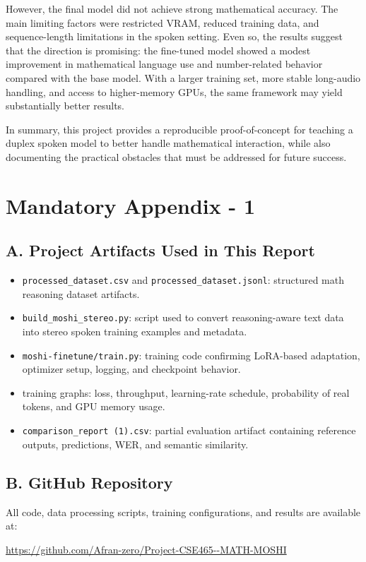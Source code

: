 \documentclass[12pt,a4paper]{article}
\begin{document}
However, the final model did not achieve strong mathematical accuracy. The main limiting factors were restricted VRAM, reduced training data, and sequence-length limitations in the spoken setting. Even so, the results suggest that the direction is promising: the fine-tuned model showed a modest improvement in mathematical language use and number-related behavior compared with the base model. With a larger training set, more stable long-audio handling, and access to higher-memory GPUs, the same framework may yield substantially better results.

In summary, this project provides a reproducible proof-of-concept for teaching a duplex spoken model to better handle mathematical interaction, while also documenting the practical obstacles that must be addressed for future success.

\section*{Mandatory Appendix - 1}

\subsection*{A. Project Artifacts Used in This Report}
\begin{itemize}[leftmargin=1.5em]
    \item \texttt{processed\_dataset.csv} and \texttt{processed\_dataset.jsonl}: structured math reasoning dataset artifacts.
    \item \texttt{build\_moshi\_stereo.py}: script used to convert reasoning-aware text data into stereo spoken training examples and metadata.
    \item \texttt{moshi-finetune/train.py}: training code confirming LoRA-based adaptation, optimizer setup, logging, and checkpoint behavior.
    \item training graphs: loss, throughput, learning-rate schedule, probability of real tokens, and GPU memory usage.
    \item \texttt{comparison\_report (1).csv}: partial evaluation artifact containing reference outputs, predictions, WER, and semantic similarity.
\end{itemize}

\subsection*{B. GitHub Repository}
All code, data processing scripts, training configurations, and results are available at:
\begin{center}
\url{https://github.com/Afran-zero/Project-CSE465--MATH-MOSHI}
\end{center}
\end{document}
